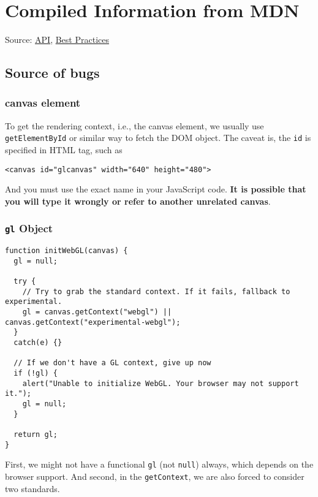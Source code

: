 \section{Compiled Information from
MDN}\label{compiled-information-from-mdn}

Source: \href{https://developer.mozilla.org/en-US/docs/Web/API}{API},
\href{https://developer.mozilla.org/en-US/docs/Web/API/WebGL_API/WebGL_best_practices}{Best
Practices}

\subsection{Source of bugs}\label{source-of-bugs}

\subsubsection{canvas element}\label{canvas-element}

To get the rendering context, i.e., the canvas element, we usually use
\texttt{getElementById} or similar way to fetch the DOM object. The
caveat is, the \texttt{id} is specified in HTML tag, such as

\begin{verbatim}
<canvas id="glcanvas" width="640" height="480">
\end{verbatim}

And you must use the exact name in your JavaScript code. \textbf{It is
possible that you will type it wrongly or refer to another unrelated
canvas}.

\subsubsection{\texorpdfstring{\texttt{gl}
Object}{gl Object}}\label{gl-object}

\begin{verbatim}
function initWebGL(canvas) {
  gl = null;

  try {
    // Try to grab the standard context. If it fails, fallback to experimental.
    gl = canvas.getContext("webgl") || canvas.getContext("experimental-webgl");
  }
  catch(e) {}

  // If we don't have a GL context, give up now
  if (!gl) {
    alert("Unable to initialize WebGL. Your browser may not support it.");
    gl = null;
  }

  return gl;
}
\end{verbatim}

First, we might not have a functional \texttt{gl} (not \texttt{null})
always, which depends on the browser support. And second, in the
\texttt{getContext}, we are also forced to consider two standards.

